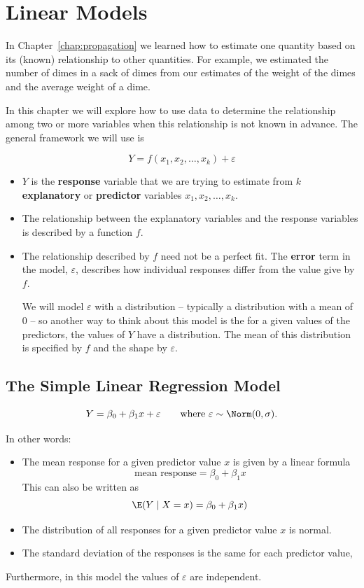 \documentclass[twoside]{book}\usepackage[]{graphicx}\usepackage[]{xcolor}
\def\term#1{\textbf{#1}}
\newcounter{example}[section]
\begin{document}
 



\chapter{Linear Models}

In Chapter~\ref{chap:propagation} we learned how to estimate one quantity based
on its (known) relationship to other quantities.  For example, we estimated the
number of dimes in a sack of dimes from our estimates of the weight of the
dimes and the average weight of a dime.  

In this chapter we will explore how to use data to determine the relationship among
two or more variables when this relationship is not known in advance.  The general
framework we will use is 

\[
Y = f(x_1, x_2, \dots, x_k) + \varepsilon
\]
\begin{itemize}
	\item $Y$ is the \term{response} variable that we are trying to estimate
		from $k$ \term{explanatory} or \term{predictor} variables $x_1, x_2, \dots, x_k$.
	\item
		The relationship between the explanatory variables and the response 
		variables is described by a function $f$.
	\item
		The relationship described by $f$ need not be a perfect fit.  The \term{error}
		term in the model, $\varepsilon$, describes how individual responses
		differ from the value give by $f$.  
		
		We will model $\varepsilon$ with a 
		distribution -- typically a distribution with a mean of 0 -- 
		so another way to think about this model is the for a given 
		values of the predictors, the values of $Y$ have a distribution.  The mean
		of this distribution is specified by $f$ and the shape by $\varepsilon$.
\end{itemize}


\section{The Simple Linear Regression Model}

\[
Y = \beta_0 + \beta_1 x + \varepsilon  \qquad \mbox{where $\varepsilon \sim \Norm(0,\sigma)$.}
\]

In other words:
\begin{itemize}
\item
The mean response for a given predictor value $x$ is given by a linear formula
\[
\mbox{mean response} = \beta_0 + \beta_1 x
\]
This can also be written as 
\[
\E(Y \mid X=x) = \beta_0 + \beta_1 x)
\]
\item
The distribution of all responses for a given predictor value $x$ is normal.
\item
The standard deviation of the responses is the same for each predictor value,
\end{itemize}
Furthermore, in this model the values of $\varepsilon$ are independent.
\end{document}
